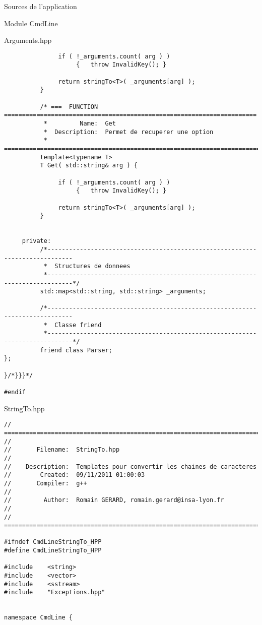 \documentclass{article}
\begin{document}
\begin{section}{Sources de l'application}
\begin{subsection}{Module CmdLine}
\begin{paragraph}{Arguments.hpp}
\begin{verbatim}
               if ( !_arguments.count( arg ) )
                    {   throw InvalidKey(); }

               return stringTo<T>( _arguments[arg] );
          }

          /* ===  FUNCTION  ======================================================================
           *         Name:  Get
           *  Description:  Permet de recuperer une option 
           * =====================================================================================*/
          template<typename T>
          T Get( std::string& arg ) {

               if ( !_arguments.count( arg ) )
                    {   throw InvalidKey(); }

               return stringTo<T>( _arguments[arg] );
          }


     private:
          /*-----------------------------------------------------------------------------
           *  Structures de donnees
           *-----------------------------------------------------------------------------*/
          std::map<std::string, std::string> _arguments;

          /*-----------------------------------------------------------------------------
           *  Classe friend
           *-----------------------------------------------------------------------------*/
          friend class Parser;
};

}/*}}}*/

#endif

  \end{verbatim}
  \end{paragraph}

  \newpage
  \begin{paragraph}{StringTo.hpp}
   \begin{verbatim}
// =====================================================================================
// 
//       Filename:  StringTo.hpp
// 
//    Description:  Templates pour convertir les chaines de caracteres
//        Created:  09/11/2011 01:00:03
//       Compiler:  g++
// 
//         Author:  Romain GERARD, romain.gerard@insa-lyon.fr
// 
// =====================================================================================

#ifndef CmdLineStringTo_HPP
#define CmdLineStringTo_HPP

#include	<string>
#include	<vector>
#include	<sstream>
#include	"Exceptions.hpp"


namespace CmdLine {


\end{verbatim}
\end{paragraph}
\end{subsection}
\end{section}
\end{document}
